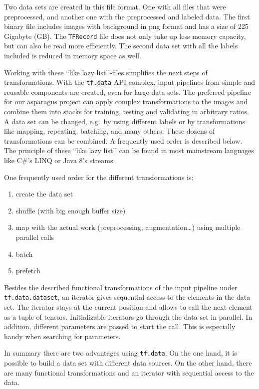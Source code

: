 Two data sets are created in this file format. One with all files that were preprocessed, and another one with the preprocessed and labeled data.
The first binary file includes images with background in png format and has a size of 225 Gigabyte (GB). The \texttt{TFRecord} file does not only take up less memory capacity, but can also be read more efficiently. The second data set with all the labels included is reduced in memory space as well.

Working with these ``like lazy list’’-files simplifies the next steps of transformations. With the \texttt{tf.data} API complex, input pipelines from simple and reusable components are created, even for large data sets. The preferred pipeline for our asparagus project can apply complex transformations to the images and combine them into stacks for training, testing and validating in arbitrary ratios. A data set can be changed, e.g.\ by using different labels or by transformations like mapping, repeating, batching, and many others. These dozens of transformations can be combined. A frequently used order is described below. The principle of these ``like lazy list’’ can be found in most mainstream languages like C\#'s LINQ or Java 8's streams.

\bigskip
One frequently used order for the different transformations is:
\begin{enumerate}[noitemsep]
\item create the data set
\item shuffle (with big enough buffer size)
\item map with the actual work (preprocessing, augmentation…) using multiple parallel calls
\item batch
\item prefetch
\end{enumerate}


Besides the described functional transformations of the input pipeline under \texttt{tf.data.dataset}, an iterator gives sequential access to the elements in the data set. The iterator stays at the current position and allows to call the next element as a tuple of tensors. Initializable iterators go through the data set in parallel. In addition, different parameters are passed to start the call. This is especially handy when searching for parameters.

In summary there are two advantages using \texttt{tf.data}. On the one hand, it is possible to build a data set with different data sources. On the other hand, there are many functional transformations and an iterator with sequential access to the data.

